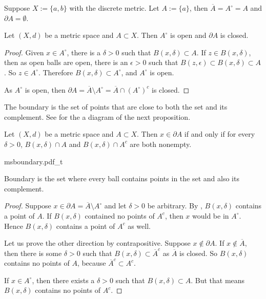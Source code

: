 \begin{example}
Suppose $X := \{ a, b \}$ with the discrete metric.
Let $A := \{ a \}$, then $\overline{A} = A^\circ = A$ and $\partial A =
\emptyset$.
\end{example}


\begin{prop}
Let $(X,d)$ be a metric space and $A \subset X$.  Then $A^\circ$ is open
and $\partial A$ is closed.
\end{prop}

\begin{proof}
Given $x \in A^\circ$, there is a $\delta > 0$ such that $B(x,\delta)
\subset A$.  If $z \in B(x,\delta)$, then as open balls are open,
there is an $\epsilon > 0$ such that $B(z,\epsilon) \subset B(x,\delta)
\subset A$.  So $z \in A^\circ$.  Therefore $B(x,\delta) \subset
A^\circ$, and $A^\circ$ is open.

As $A^\circ$ is open, then
$\partial A = \overline{A} \setminus A^\circ = \overline{A} \cap
{(A^\circ)}^c$ is closed.
\end{proof}

The boundary is the set of points that are close to both the set and its
complement.  See  for the a diagram
of the next proposition.

\begin{prop}
Let $(X,d)$ be a metric space and $A \subset X$.  Then $x \in \partial A$
if and only if for every $\delta > 0$,
$B(x,\delta) \cap A$ and
$B(x,\delta) \cap A^c$ are both nonempty.
\end{prop}

\begin{myfigureht}
{msboundary.pdf_t}
\caption{Boundary is the set where every ball contains points in the set and
also its complement.\label{fig:msboundary}}
\end{myfigureht}

\begin{proof}
Suppose $x \in \partial A =  \overline{A} \setminus A^\circ$ and
let $\delta > 0$ be arbitrary.
By , $B(x,\delta)$ contains
a point of $A$.  If $B(x,\delta)$ contained no points of $A^c$,
then $x$ would be in $A^\circ$.  Hence $B(x,\delta)$ contains a point of
$A^c$ as well.

Let us prove the other direction by contrapositive.  Suppose
$x \notin \partial A$.
If $x \notin \overline{A}$, then there is some $\delta > 0$ such that
$B(x,\delta) \subset \overline{A}^c$ as $\overline{A}$ is closed.
So $B(x,\delta)$ contains no points of $A$, because $\overline{A}^c \subset
A^c$.

If $x \in A^\circ$, then there exists a $\delta > 0$
such that $B(x,\delta) \subset A$.  But that means $B(x,\delta)$
contains no points of $A^c$.
\end{proof}

